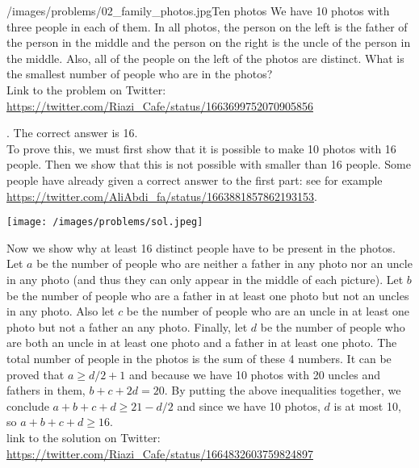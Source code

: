 \begin{problem}{/images/problems/02_family_photos.jpg}{Ten photos}
	We have 10 photos with three people in each of them. In all photos, the person on the left is the father of the person in the middle and the person on the right is the uncle of the person in the middle. Also, all of the people on the left of the photos are distinct. What is the smallest number of people who are in the photos?\\[0.2cm]

	Link to the problem on Twitter:  \url{https://twitter.com/Riazi_Cafe/status/1663699752070905856}
\end{problem}

\begin{solution}.
	The correct answer is 16. \\[0.2cm]
	To prove this, we must first show that it is possible to make 10 photos with 16 people. Then we show that this is not possible with smaller than 16 people. Some people have already given a correct answer to the first part: see for example \url{https://twitter.com/AliAbdi_fa/status/1663881857862193153}.
	\begin{center}
		\texttt{[image: /images/problems/sol.jpeg]}
	\end{center}	
	Now we show why at least 16 distinct people have to be present in the photos. Let $a$ be the number of people who are neither a father in any photo nor an uncle in any photo (and thus they can only appear in the middle of each picture). Let $b$ be the number of people who are a father in at least one photo but not an uncles in any photo. Also let $c$ be the number of people who are an uncle in at least one photo but not a father an any photo. Finally, let $d$ be the number of people who are both an uncle in at least one photo and a father in at least one  photo. The total number of people in the photos is the sum of these 4 numbers. It can be proved that $a \geq d/2 + 1$ and because we have 10 photos with 20 uncles and fathers in them, $b + c + 2d = 20$. By putting the above inequalities together, we conclude $a + b + c + d \geq 21 - d/2$ and since we have 10 photos, $d$ is at most 10, so $a + b + c + d \geq 16$.\\[0.2cm]

	link to the solution on Twitter: \url{https://twitter.com/Riazi_Cafe/status/1664832603759824897}

\end{solution}